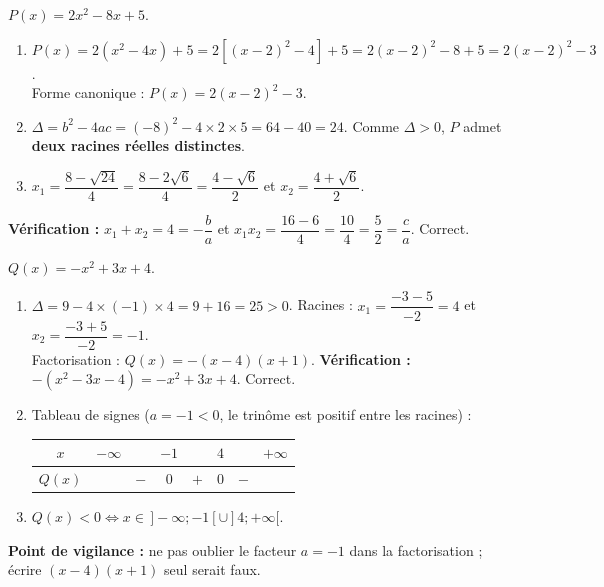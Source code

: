 \documentclass[11pt]{article}
\begin{document}
\begin{corrige}
$P(x)=2x^2-8x+5$.
\begin{enumerate}
    \item $P(x)=2\left(x^2-4x\right)+5=2\left[(x-2)^2-4\right]+5=2(x-2)^2-8+5=2(x-2)^2-3$.\\
    Forme canonique : $P(x)=2(x-2)^2-3$.
    \item $\Delta=b^2-4ac=(-8)^2-4\times 2\times 5=64-40=24$. Comme $\Delta>0$, $P$ admet \textbf{deux racines réelles distinctes}.
    \item $x_1=\dfrac{8-\sqrt{24}}{4}=\dfrac{8-2\sqrt{6}}{4}=\dfrac{4-\sqrt{6}}{2}$ et $x_2=\dfrac{4+\sqrt{6}}{2}$.
\end{enumerate}
\textbf{Vérification :} $x_1+x_2=4=-\dfrac{b}{a}$ et $x_1x_2=\dfrac{16-6}{4}=\dfrac{10}{4}=\dfrac{5}{2}=\dfrac{c}{a}$. Correct.
\end{corrige}

\begin{corrige}
$Q(x)=-x^2+3x+4$.
\begin{enumerate}
    \item $\Delta=9-4\times(-1)\times 4=9+16=25>0$. Racines : $x_1=\dfrac{-3-5}{-2}=4$ et $x_2=\dfrac{-3+5}{-2}=-1$.\\
    Factorisation : $Q(x)=-(x-4)(x+1)$. \textbf{Vérification :} $-(x^2-3x-4)=-x^2+3x+4$. Correct.
    \item Tableau de signes ($a=-1<0$, le trinôme est positif entre les racines) :
    \begin{center}
    \begin{tabular}{|c|ccccccc|}\hline
    $x$ & $-\infty$ & & $-1$ & & $4$ & & $+\infty$ \\ \hline
    $Q(x)$ & & $-$ & $0$ & $+$ & $0$ & $-$ & \\ \hline
    \end{tabular}
    \end{center}
    \item $Q(x)<0 \iff x\in\,]-\infty;-1[\cup]4;+\infty[$.
\end{enumerate}
\textbf{Point de vigilance :} ne pas oublier le facteur $a=-1$ dans la factorisation ; écrire $(x-4)(x+1)$ seul serait faux.
\end{corrige}
\end{document}
